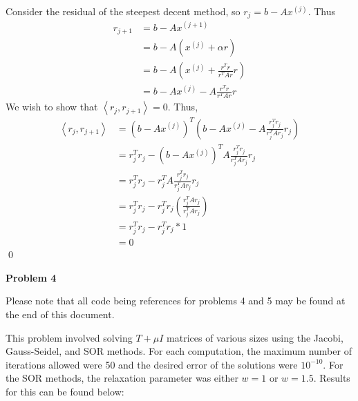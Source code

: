 \documentclass{article}
\newcommand{\Problem}[1]{\textbf{\large Problem #1}}
\begin{document}
Consider the residual of the steepest decent method, so $r_j = b - Ax^{(j)}$.
Thus 
\begin{align*}
r_{j+1} &= b - Ax^{(j+1)} \\
&= b - A(x^{(j)} + \alpha r) \\ 
&= b - A(x^{(j)} + \frac{r^Tr}{r^TAr}r)\\
&= b - Ax^{(j)} - A \frac{r^Tr}{r^TAr}r
\end{align*}
We wish to show that $\left<r_j,r_{j+1}\right> = 0$.
Thus,
\begin{align*}
\left<r_j,r_{j+1}\right> &= (b - Ax^{(j)})^T(b - Ax^{(j)} - A\frac{r_j^Tr_j}{r_j^TAr_j}r_j) \\
&= r_j^Tr_j - (b - Ax^{(j)})^TA\frac{r_j^Tr_j}{r_j^TAr_j}r_j \\
&= r_j^Tr_j - r_j^TA\frac{r_j^Tr_j}{r_j^TAr_j}r_j \\ 
&= r_j^Tr_j - r_j^Tr_j \left(\frac{r_j^TAr_j}{r_j^TAr_j}\right) \\
&= r_j^Tr_j - r_j^Tr_j * 1 \\
&= 0
\end{align*}
\qed

\Problem{4}

Please note that all code being references for problems 4 and 5 may be found at the end of this document.

This problem involved solving $T + \mu I$ matrices of various sizes using the Jacobi, Gauss-Seidel, and SOR methods. 
For each computation, the maximum number of iterations allowed were 50 and the desired error of the solutions were $10^{-10}$. 
For the SOR methods, the relaxation parameter was either $w = 1$ or $w = 1.5$. 
Results for this can be found below:
\end{document}
